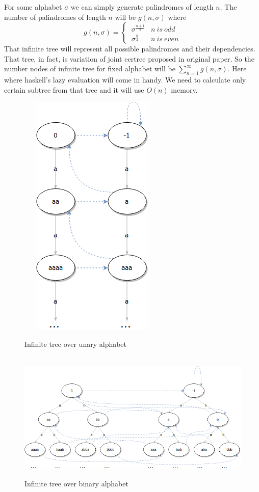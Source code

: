 For some alphabet $\sigma$ we can simply generate palindromes of length $n$. The number of palindromes of length $n$ will be $g(n, \sigma)$ where 
$$g(n, \sigma) = \begin{cases}
\ \sigma^{\frac{n+1}{2}}  & n \ is \ odd\\
\ \sigma^{\frac{n}{2}}   & n \ is \ even
\end{cases}$$
 That infinite tree will represent all possible palindromes and their dependencies. That tree, in fact, is variation of joint eertree proposed in original paper. So the number nodes of infinite tree for fixed alphabet will be $\sum_{n=1}^{\infty} g(n, \sigma)$. Here where haskell's lazy evaluation will come in handy. We need to calculate only certain subtree from that tree and it will use $O(n)$ memory. 
\begin{figure}[H]
  \centering
     \includegraphics[width=0.4\linewidth]{unary.png}
 \caption{Infinite tree over unary alphabet}
\end{figure}
\begin{figure}[H]
  \centering
     \includegraphics[width=\linewidth]{binary.png}
 \caption{Infinite tree over binary alphabet}
\end{figure}
